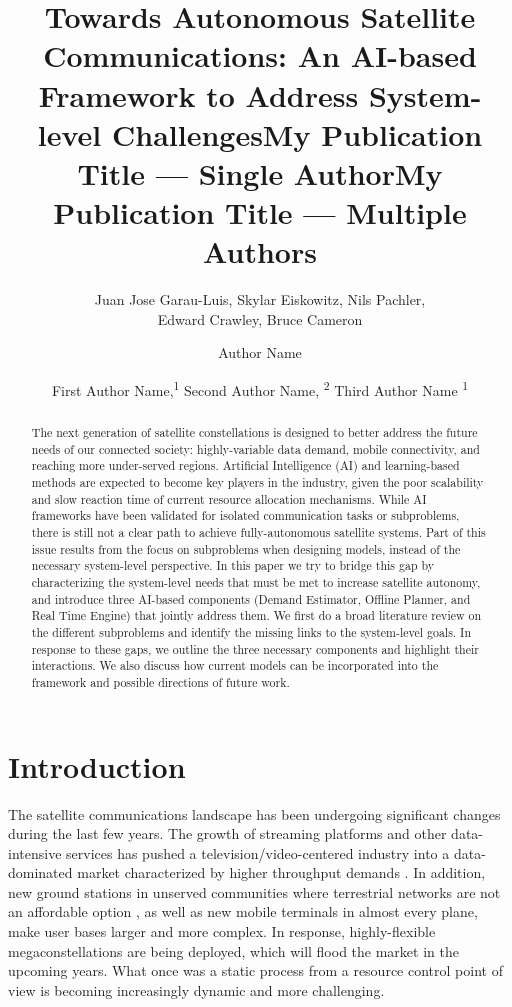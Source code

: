 \documentclass[letterpaper]{article} %
\title{Towards Autonomous Satellite Communications: An AI-based Framework to Address System-level Challenges}
\author{
Juan Jose Garau-Luis\equalcontrib, Skylar Eiskowitz\equalcontrib, Nils Pachler\equalcontrib,\\
Edward Crawley, Bruce Cameron
}
\title{My Publication Title --- Single Author}
\author {
Author Name
}
\title{My Publication Title --- Multiple Authors}
\author {
First Author Name,\textsuperscript{\rm 1}
Second Author Name, \textsuperscript{\rm 2}
Third Author Name \textsuperscript{\rm 1}
}
\begin{document}
\maketitle

\begin{abstract}
The next generation of satellite constellations is designed to better address the future needs of our connected society: highly-variable data demand, mobile connectivity, and reaching more under-served regions. Artificial Intelligence (AI) and learning-based methods are expected to become key players in the industry, given the poor scalability and slow reaction time of current resource allocation mechanisms. While AI frameworks have been validated for isolated communication tasks or subproblems, there is still not a clear path to achieve fully-autonomous satellite systems. Part of this issue results from the focus on subproblems when designing models, instead of the necessary system-level perspective. In this paper we try to bridge this gap by characterizing the system-level needs that must be met to increase satellite autonomy, and introduce three AI-based components (Demand Estimator, Offline Planner, and Real Time Engine) that jointly address them. We first do a broad literature review on the different subproblems and identify the missing links to the system-level goals. In response to these gaps, we outline the three necessary components and highlight their interactions. We also discuss how current models can be incorporated into the framework and possible directions of future work.
\end{abstract}


\section{Introduction}

The satellite communications landscape has been undergoing significant changes during the last few years. The growth of streaming platforms and other data-intensive services has pushed a television/video-centered industry into a data-dominated market characterized by higher throughput demands \cite{NorthernSkyResearch2019}. In addition, new ground stations in unserved communities where terrestrial networks are not an affordable option \cite{Reut}, as well as new mobile terminals in almost every plane, make user bases larger and more complex. In response, highly-flexible megaconstellations are being deployed, which will flood the market in the upcoming years. What once was a static process from a resource control point of view is becoming increasingly dynamic and more challenging.
\end{document}
